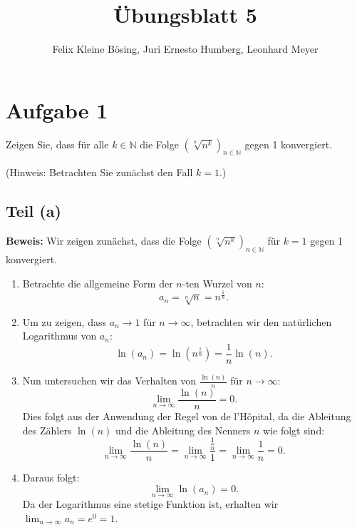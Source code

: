 \documentclass[11pt]{article}
\begin{document}
\title{Übungsblatt 5}
\author{Felix Kleine Bösing, Juri Ernesto Humberg, Leonhard Meyer}
\maketitle

\section*{Aufgabe 1}

Zeigen Sie, dass für alle \( k \in \mathbb{N} \) die Folge \( \left( \sqrt[n]{n^k} \right)_{n \in \mathbb{N}} \) gegen 1 konvergiert.

(Hinweis: Betrachten Sie zunächst den Fall \( k = 1 \).)

\subsection*{Teil (a)}

\textbf{Beweis:} Wir zeigen zunächst, dass die Folge \( \left( \sqrt[n]{n^k} \right)_{n \in \mathbb{N}} \) für \( k = 1 \) gegen 1 konvergiert.

\begin{enumerate}
    \item Betrachte die allgemeine Form der \( n \)-ten Wurzel von \( n \):
    \[
    a_n = \sqrt[n]{n} = n^{\frac{1}{n}}.
    \]

    \item Um zu zeigen, dass \( a_n \to 1 \) für \( n \to \infty \), betrachten wir den natürlichen Logarithmus von \( a_n \):
    \[
    \ln(a_n) = \ln\left(n^{\frac{1}{n}}\right) = \frac{1}{n} \ln(n).
    \]

    \item Nun untersuchen wir das Verhalten von \( \frac{\ln(n)}{n} \) für \( n \to \infty \):
    \[
    \lim_{n \to \infty} \frac{\ln(n)}{n} = 0.
    \]
    Dies folgt aus der Anwendung der Regel von de l'Hôpital, da die Ableitung des Zählers \( \ln(n) \) und die Ableitung des Nenners \( n \) wie folgt sind:
    \[
    \lim_{n \to \infty} \frac{\ln(n)}{n} = \lim_{n \to \infty} \frac{\frac{1}{n}}{1} = \lim_{n \to \infty} \frac{1}{n} = 0.
    \]

    \item Daraus folgt:
    \[
    \lim_{n \to \infty} \ln(a_n) = 0.
    \]
    Da der Logarithmus eine stetige Funktion ist, erhalten wir \( \lim_{n \to \infty} a_n = e^0 = 1 \).

\end{enumerate}
\end{document}
